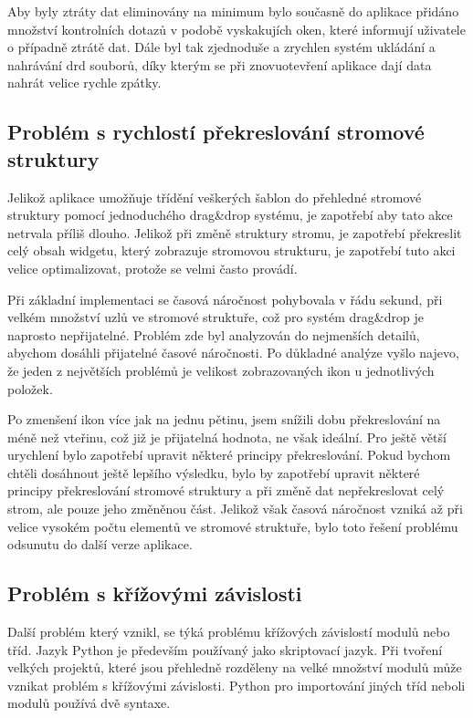\documentclass[thesis=B,czech]{resources/FITthesis}[2012/06/26]
\begin{document}
Aby byly ztráty dat eliminovány na minimum bylo současně do aplikace přidáno množství kontrolních dotazů v podobě vyskakujích oken, které informují uživatele o případně ztrátě dat. Dále byl tak zjednoduše a zrychlen systém ukládání a nahrávání drd souborů, díky kterým se při znovuotevření aplikace dají data nahrát velice rychle zpátky. 

	\subsection{Problém s rychlostí překreslování stromové struktury}
Jelikož aplikace umožňuje třídění veškerých šablon do přehledné stromové struktury pomocí jednoduchého drag\&drop systému, je zapotřebí aby tato akce netrvala příliš dlouho. Jelikož při změně struktury stromu, je zapotřebí překreslit celý obsah widgetu, který zobrazuje stromovou strukturu, je zapotřebí tuto akci velice optimalizovat, protože se velmi často provádí. \par

Při základní implementaci se časová náročnost pohybovala v řádu sekund, při velkém množství uzlů ve stromové struktuře, což pro systém drag\&drop je naprosto nepřijatelné. Problém zde byl analyzován do nejmenších detailů, abychom dosáhli přijatelné časové náročnosti. Po důkladné analýze vyšlo najevo, že jeden z největších problémů je velikost zobrazovaných  ikon u jednotlivých položek. \par

Po zmenšení ikon více jak na jednu pětinu, jsem snížili dobu překreslování na méně než vteřinu, což již je přijatelná hodnota, ne však ideální. Pro ještě větší urychlení bylo zapotřebí upravit některé principy překreslování. Pokud bychom chtěli dosáhnout ještě lepšího výsledku, bylo by zapotřebí upravit některé principy překreslování stromové struktury a při změně dat nepřekreslovat celý strom, ale pouze jeho změněnou část. Jelikož však časová náročnost vzniká až při velice vysokém počtu elementů ve stromové struktuře, bylo toto řešení problému odsunutu do další verze aplikace. 
	\subsection{Problém s křížovými závislosti}
Další problém který vznikl, se týká problému křížových závislostí modulů nebo tříd. Jazyk Python je především používaný jako skriptovací jazyk. Při tvoření velkých projektů, které jsou přehledně rozděleny na velké množství modulů může vznikat problém s křížovými závislosti. Python pro importování jiných tříd neboli modulů používá dvě syntaxe.
\end{document}
